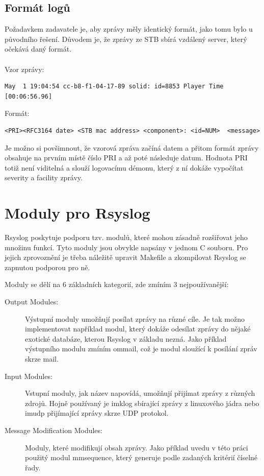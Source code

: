 \documentclass[thesis=B,czech]{FITthesis}[2012/06/26]
\begin{document}
\subsection{Formát logů}
Požadavkem zadavatele je, aby zprávy měly identický formát, jako tomu bylo u původního řešení. Důvodem je, že zprávy ze STB sbírá vzdálený server, který očekává daný formát.
\\
\\
Vzor zprávy:
\begin{lstlisting}[style=RainerScriptSimpleStyle]
May  1 19:04:54 cc-b8-f1-04-17-89 solid: id=8853 Player Time [00:06:56.96]
\end{lstlisting}
Formát:
\begin{lstlisting}[style=RainerScriptSimpleStyle]
<PRI><RFC3164 date> <STB mac address> <component>: <id=NUM>  <message>
\end{lstlisting}

Je možno si povšimnout, že vzorová zpráva začíná datem a přitom formát zprávy obsahuje na prvním místě číslo PRI a až poté následuje datum. Hodnota PRI totiž není viditelná a slouží logovacímu démonu, který z ní dokáže vypočítat severity a facility zprávy.

\section{Moduly pro Rsyslog}
Rsyslog poskytuje podporu tzv. modulů, které mohou zásadně rozšiřovat jeho množinu funkcí. Tyto moduly jsou obvykle napsány v jednom C souboru. Pro jejich zprovoznění je třeba náležitě upravit Makefile a zkompilovat Rsyslog se zapnutou podporou pro ně.

Moduly se dělí na 6 základních kategorií, zde zmíním 3 nejpoužívanější:

\begin{description}
  \item [Output Modules:] Výstupní moduly umožňují posílat zprávy na různé cíle. Je tak možno implementovat například modul, který dokáže odesílat zprávy do nějaké exotické databáze, kterou Rsyslog v základu nezná. Jako příklad výstupního modulu zmíním ommail, což je modul sloužící k posílání zpráv skrze mail.
  \item [Input Modules:] Vstupní moduly, jak název napovídá, umožňují přijímat zprávy z různých zdrojů. Hojně používaný je imklog sbírající zprávy z linuxového jádra nebo imudp přijímající zprávy skrze UDP protokol.
  \item [Message Modification Modules:] Moduly, které modifikují obsah zprávy. Jako příklad uvedu v této práci použitý modul mmsequence, který generuje podle zadaných kritérií číselné řady.
\end{description}
\end{document}
